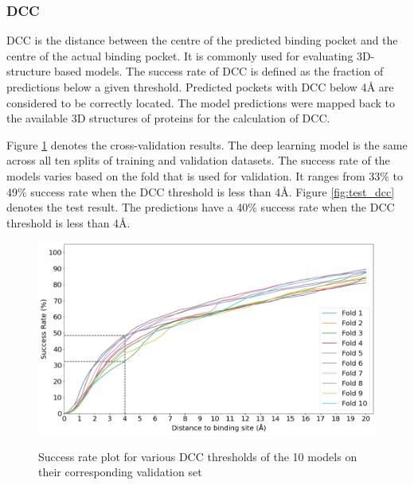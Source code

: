 \documentclass[journal=jacsat,manuscript=article]{achemso}
\begin{document}
\subsubsection{DCC}
DCC is the distance between the centre of the predicted binding pocket and the centre of the actual binding pocket. It is commonly used for evaluating 3D-structure based models. The success rate of DCC is defined as the fraction of predictions below a given threshold. Predicted pockets with DCC below 4{\AA} are considered to be correctly located. The model predictions were mapped back to the available 3D structures of proteins for the calculation of DCC.

Figure \ref{fig:valid_dcc} denotes the cross-validation results. The deep learning model is the same across all ten splits of training and validation datasets. The success rate of the models varies based on the fold that is used for validation. It ranges from 33\% to 49\% success rate when the DCC threshold is less than 4\AA. Figure \ref{fig:test_dcc} denotes the test result. The predictions have a 40\% success rate when the DCC threshold is less than 4\AA.

\vspace{10 mm}
\begin{figure}
    \caption{\centering Success rate plot for various DCC thresholds of the 10 models on their corresponding validation set}
    \centering
    \noindent\includegraphics[scale=0.45]{valid_dcc.png}
    \label{fig:valid_dcc}
\end{figure}
\end{document}
